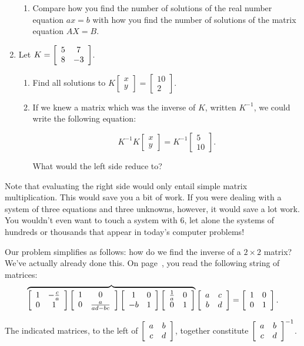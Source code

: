 \documentclass[../gatm.tex]{subfiles}
\begin{document}
\begin{enumerate}
\begin{enumerate}
\item Compare how you find the number of solutions of the real number equation $ax=b$ with how you find the number of solutions of the matrix equation $AX=B$.
\end{enumerate}
\item Let $K=\left[\begin{array}{cc} 5 & 7 \\ 8 & -3 \end{array}\right]$.\begin{enumerate}
\item Find all solutions to $K\left[\begin{array}{c} x \\ y \end{array}\right]=\left[\begin{array}{c} 10 \\ 2 \end{array}\right]$.
\item If we knew a matrix which was the inverse of $K$, written $K^{-1}$, we could write the following equation:

$$K^{-1}K\left[\begin{array}{c} x \\ y \end{array}\right]=K^{-1}\left[\begin{array}{c} 5 \\ 10 \end{array}\right].$$

What would the left side reduce to?
\end{enumerate}
\setcounter{problem_i}{\value{enumi}}
\end{enumerate}

\noindent Note that evaluating the right side would only entail simple matrix multiplication. This would save you a bit of work. If you were dealing with a system of three equations and three unknowns, however, it would save a lot work. You wouldn't even want to touch a system with $6$, let alone the systems of hundreds or thousands that appear in today's computer problems!

Our problem simplifies as follows: how do we find the inverse of a $2\times 2$ matrix? We've actually already done this. On page~\pageref{prob:list_of_matrices}, you read the following string of matrices:
$$\overbrace{\left[\begin{array}{cc} 1 & -\frac{c}{a} \\ 0 & 1 \end{array}\right]\left[\begin{array}{cc} 1 & 0 \\ 0 & \frac{a}{ad-bc} \end{array}\right]\left[\begin{array}{cc} 1 & 0 \\ -b & 1 \end{array}\right]\left[\begin{array}{cc} \frac{1}{a} & 0 \\ 0 & 1 \end{array}\right]}\left[\begin{array}{cc} a & c \\ b & d \end{array}\right]=\left[\begin{array}{cc} 1 & 0 \\ 0 & 1 \end{array}\right].$$

\noindent The indicated matrices, to the left of $\left[\begin{array}{cc} a & b \\ c & d \end{array}\right]$, together constitute $\left[\begin{array}{cc} a & b \\ c & d \end{array}\right]^{-1}$.
\end{document}
